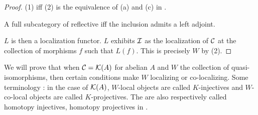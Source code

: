 \documentclass{article}
\begin{document}
\begin{proof}
  (1) iff (2) is the equivalence of (a) and (c)
  in \cite[\href{https://kerodon.net/tag/05Z2}{Tag 05Z2}]{kerodon}.

  A full subcategory of reflective iff the inclusion 
  admits a left adjoint.\cite[\href{https://kerodon.net/tag/02FA}{Tag 02FA}]{kerodon}

  $L$ is then a localization functor.
  \cite[\href{https://kerodon.net/tag/04JL}{Tag 04JL}]{kerodon}
  $L$ exhibits $\mathcal{I}$ as the localization of $\mathcal{C}$ at
  the collection of morphisms $f$ such that $L(f)$.
  \cite[\href{https://kerodon.net/tag/04JH}{Tag 04JH}]{kerodon}
  This is precisely $W$ by (2).
\end{proof}

We will prove that when $\mathcal{C} = \mathcal{K}(A)$ for abelian $A$ 
and $W$ the collection of quasi-isomorphisms,
then certain conditions make $W$ localizing or co-localizing.
Some terminology : in the case of $\mathcal{K}(A)$,
$W$-local objects are called $K$-injectives 
and $W$-co-local objects are called $K$-projectives.
\cite[\href{https://stacks.math.columbia.edu/tag/070G}{Tag 070G}]{stacks-project}
The are also respectively called homotopy injectives,
homotopy projectives in \cite[Section 14.3]{KS06}.
\end{document}
